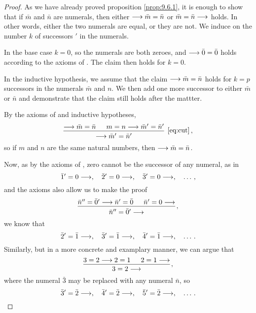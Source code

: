 \begin{proof}
    As we have already proved proposition \ref{prop:9.6.1},
    it is enough to show that if \(\bar m\) and \(\bar n\) are
    numerals, then either \(\longrightarrow \bar m = \bar n\) or \(\bar m = \bar n\longrightarrow\) holds.
    In other words, either the two numerals are equal, or they are not.
    We induce on the number \(k\) of successors \(\prime\) in the numerals.

    In the base case \(k=0\), so the numerals are both zeroes,
    and \(\longrightarrow\bar0=\bar0\) holds according to the axioms of \PA{}.
    The claim then holds for \(k=0\).

    In the inductive hypothesis, we assume that the claim \(\longrightarrow\bar m=\bar n\)
    holds for \(k = p\) successors in the numerals \(\bar m\) and \(n\).
    We then add one more successor to either \(\bar m\) or \(\bar n\)
    and demonstrate that the claim still holds after the mattter.

    By the axioms of \PA{} and inductive hypotheses,
    \begin{equation*}
        \begin{prooftree}
            \hypo{\seq\bar m=\bar n}
            \hypo{m = n\seq\bar m'=\bar n'}
            \infer2[\eqref{eq:cut}]{\seq\bar m'=\bar n'}
        \end{prooftree}\,,
    \end{equation*}
    so if \(m\) and \(n\) are the same natural numbers,
    then \(\longrightarrow\bar m=\bar n\).

    Now, as by the axioms of \PA{}, zero cannot be the successor
    of any numeral, as in
    \begin{equation*}
        \bar1'=0\longrightarrow,\quad
        \bar2'=0\longrightarrow,\quad
        \bar3'=0\longrightarrow,\quad
        \ldots\,,
    \end{equation*}
    and the axioms also allow us to make the proof
    \begin{equation*}
        \begin{prooftree}
            \hypo{\bar n''=\bar 0'\seq \bar n' = \bar0}
            \hypo{\bar n'=0\seq}
            \infer2{\bar n''=\bar 0'\seq}
        \end{prooftree}\,,
    \end{equation*}
    we know that
    \begin{equation*}
        \bar2'=\bar1\longrightarrow,\quad
        \bar3'=\bar1\longrightarrow,\quad
        \bar4'=\bar1\longrightarrow,\quad
        \ldots\,.
    \end{equation*}
    Similarly, but in a more concrete and examplary manner,
    we can argue that
    \begin{equation*}
        \begin{prooftree}
            \hypo{3 = 2 \seq 2 = 1}
            \hypo{2 = 1 \seq}
            \infer2{3 = 2\seq}
        \end{prooftree}\,,
    \end{equation*}
    where the numeral \(\bar3\) may be replaced with any numeral \(\bar n\), so
    \begin{equation*}
        \bar3'=\bar2\longrightarrow,\quad
        \bar4'=\bar2\longrightarrow,\quad
        \bar5'=\bar2\longrightarrow,\quad
        \ldots\,.
    \end{equation*}


\end{proof}
